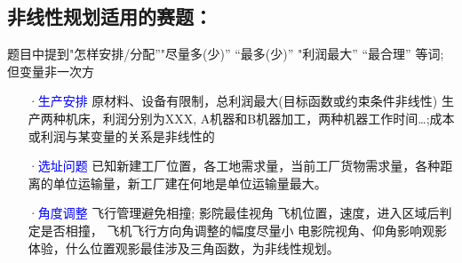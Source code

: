 \documentclass[a4paper,20pt]{article}
\begin{document}
    \subsection{非线性规划适用的赛题：}
    题目中提到"怎样安排/分配”"尽量多(少)” “最多(少)” "利润最大” “最合理” 等词;但变量非一次方
    \begin{itemize}
        \item[·\textcolor{blue}{生产安排}] 原材料、设备有限制，总利润最大(目标函数或约束条件非线性)
            生产两种机床，利润分别为XXX, A机器和B机器加工，两种机器工作时间…;成本或利润与某变量的关系是非线性的
        \item[·\textcolor{blue}{选址问题}] 已知新建工厂位置，各工地需求量，当前工厂货物需求量，各种距离的单位运输量，新工厂建在何地是单位运输量最大。
        \item[·\textcolor{blue}{角度调整}] 飞行管理避免相撞; 影院最佳视角
            飞机位置，速度，进入区域后判定是否相撞， 飞机飞行方向角调整的幅度尽量小
            电影院视角、仰角影响观影体验，什么位置观影最佳涉及三角函数，为非线性规划。
    \end{itemize}
\end{document}

